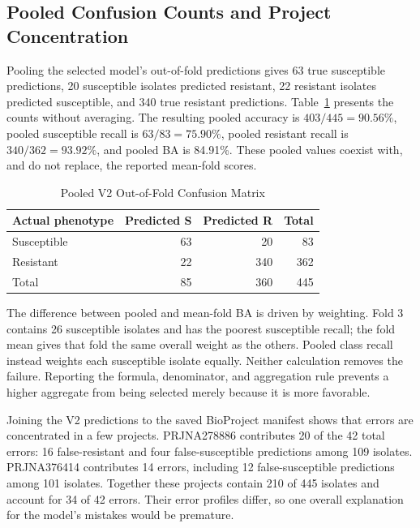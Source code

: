 \subsection{Pooled Confusion Counts and Project Concentration}
Pooling the selected model's out-of-fold predictions gives 63 true susceptible predictions, 20 susceptible isolates predicted resistant, 22 resistant isolates predicted susceptible, and 340 true resistant predictions. Table~\ref{tab:confusion} presents the counts without averaging. The resulting pooled accuracy is $403/445=90.56\%$, pooled susceptible recall is $63/83=75.90\%$, pooled resistant recall is $340/362=93.92\%$, and pooled BA is 84.91\%. These pooled values coexist with, and do not replace, the reported mean-fold scores.

\begin{table}[t]
\caption{Pooled V2 Out-of-Fold Confusion Matrix}
\label{tab:confusion}
\centering\small
\begin{tabular}{lrrr}\toprule
Actual phenotype & Predicted S & Predicted R & Total\\\midrule
Susceptible &63&20&83\\
Resistant &22&340&362\\\midrule
Total &85&360&445\\\bottomrule
\end{tabular}
\end{table}

The difference between pooled and mean-fold BA is driven by weighting. Fold 3 contains 26 susceptible isolates and has the poorest susceptible recall; the fold mean gives that fold the same overall weight as the others. Pooled class recall instead weights each susceptible isolate equally. Neither calculation removes the failure. Reporting the formula, denominator, and aggregation rule prevents a higher aggregate from being selected merely because it is more favorable.

Joining the V2 predictions to the saved BioProject manifest shows that errors are concentrated in a few projects. PRJNA278886 contributes 20 of the 42 total errors: 16 false-resistant and four false-susceptible predictions among 109 isolates. PRJNA376414 contributes 14 errors, including 12 false-susceptible predictions among 101 isolates. Together these projects contain 210 of 445 isolates and account for 34 of 42 errors. Their error profiles differ, so one overall explanation for the model's mistakes would be premature.

